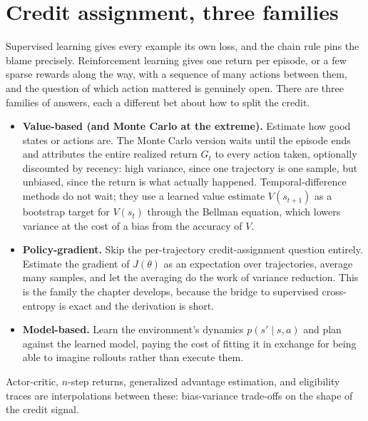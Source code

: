
\section{Credit assignment, three families}\label{sec:credit-assignment}

Supervised learning gives every example its own loss, and the chain rule pins
the blame precisely. Reinforcement learning gives one return per episode, or a
few sparse rewards along the way, with a sequence of many actions between
them, and the question of which action mattered is genuinely open. There are
three families of answers, each a different bet about how to split the credit.

\begin{itemize}
\item \textbf{Value-based (and Monte Carlo at the extreme).} Estimate how good
states or actions are. The Monte Carlo version waits until the episode ends
and attributes the entire realized return $G_t$ to every action taken,
optionally discounted by recency: high variance, since one trajectory is one
sample, but unbiased, since the return is what actually happened.
Temporal-difference methods do not wait; they use a learned value estimate
$V(s_{t+1})$ as a bootstrap target for $V(s_t)$ through the Bellman equation,
which lowers variance at the cost of a bias from the accuracy of $V$.
\item \textbf{Policy-gradient.} Skip the per-trajectory credit-assignment
question entirely. Estimate the gradient of $J(\theta)$ as an expectation over
trajectories, average many samples, and let the averaging do the work of
variance reduction. This is the family the chapter develops, because the
bridge to supervised cross-entropy is exact and the derivation is short.
\item \textbf{Model-based.} Learn the environment's dynamics $p(s' \mid s, a)$
and plan against the learned model, paying the cost of fitting it in exchange
for being able to imagine rollouts rather than execute them.
\end{itemize}

Actor-critic, $n$-step returns, generalized advantage estimation, and
eligibility traces are interpolations between these: bias-variance trade-offs
on the shape of the credit signal.

